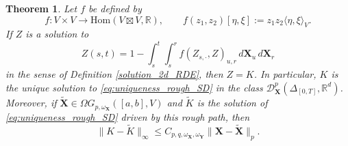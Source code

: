 \documentclass{article}%
\newtheorem{theorem}{Theorem}
\begin{document}
\begin{theorem}
Let \(f\) be defined by
\[
f: V \times V \to \mathrm{Hom}(V \boxtimes V, \mathbb{R}), 
\qquad 
f(z_1,z_2)[\eta,\xi] := z_1 z_2 \langle \eta,\xi\rangle_V.
\]
If \(Z\) is a solution to
\begin{equation}\label{eq:uniqueness_rough_SD}
Z(s,t)
=
1-\int_s^t \int_s^r f(Z_{s,\cdot},Z)_{u,r}\,d\mathbf{X}_u\,d\mathbf{X}_r
\end{equation}
in the sense of Definition \ref{solution_2d_RDE}, then \(Z=K\). In particular, \(K\) is the unique solution to \eqref{eq:uniqueness_rough_SD} in the class \(\mathcal{D}^p_{\mathbf X}(\Delta_{[0,T]},\mathbb R^d)\). Moreover, if \(\tilde{\mathbf{X}} \in \Omega G_{p,\omega_{\mathbf{X}}}([a,b],V)\) and $\tilde K$ is the solution of \eqref{eq:uniqueness_rough_SD} driven by this rough path, then
\[
\|K-\tilde K\|_{\infty}
\leq
C_{p,q,\omega_{\mathbf{X}},\omega_{\mathbf{Y}}}
\|\mathbf{X}-\tilde{\mathbf{X}}\|_{p}.
\]
\end{theorem}
\end{document}

